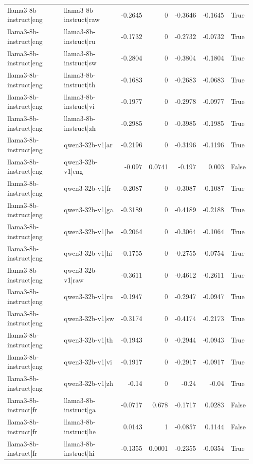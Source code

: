 \begin{table}
\begin{tabular}{l l r r r r l}
llama3-8b-instruct|eng & llama3-8b-instruct|raw & -0.2645 & 0 & -0.3646 & -0.1645 & True \\
llama3-8b-instruct|eng & llama3-8b-instruct|ru & -0.1732 & 0 & -0.2732 & -0.0732 & True \\
llama3-8b-instruct|eng & llama3-8b-instruct|sw & -0.2804 & 0 & -0.3804 & -0.1804 & True \\
llama3-8b-instruct|eng & llama3-8b-instruct|th & -0.1683 & 0 & -0.2683 & -0.0683 & True \\
llama3-8b-instruct|eng & llama3-8b-instruct|vi & -0.1977 & 0 & -0.2978 & -0.0977 & True \\
llama3-8b-instruct|eng & llama3-8b-instruct|zh & -0.2985 & 0 & -0.3985 & -0.1985 & True \\
llama3-8b-instruct|eng & qwen3-32b-v1|ar & -0.2196 & 0 & -0.3196 & -0.1196 & True \\
llama3-8b-instruct|eng & qwen3-32b-v1|eng & -0.097 & 0.0741 & -0.197 & 0.003 & False \\
llama3-8b-instruct|eng & qwen3-32b-v1|fr & -0.2087 & 0 & -0.3087 & -0.1087 & True \\
llama3-8b-instruct|eng & qwen3-32b-v1|ga & -0.3189 & 0 & -0.4189 & -0.2188 & True \\
llama3-8b-instruct|eng & qwen3-32b-v1|he & -0.2064 & 0 & -0.3064 & -0.1064 & True \\
llama3-8b-instruct|eng & qwen3-32b-v1|hi & -0.1755 & 0 & -0.2755 & -0.0754 & True \\
llama3-8b-instruct|eng & qwen3-32b-v1|raw & -0.3611 & 0 & -0.4612 & -0.2611 & True \\
llama3-8b-instruct|eng & qwen3-32b-v1|ru & -0.1947 & 0 & -0.2947 & -0.0947 & True \\
llama3-8b-instruct|eng & qwen3-32b-v1|sw & -0.3174 & 0 & -0.4174 & -0.2173 & True \\
llama3-8b-instruct|eng & qwen3-32b-v1|th & -0.1943 & 0 & -0.2944 & -0.0943 & True \\
llama3-8b-instruct|eng & qwen3-32b-v1|vi & -0.1917 & 0 & -0.2917 & -0.0917 & True \\
llama3-8b-instruct|eng & qwen3-32b-v1|zh & -0.14 & 0 & -0.24 & -0.04 & True \\
llama3-8b-instruct|fr & llama3-8b-instruct|ga & -0.0717 & 0.678 & -0.1717 & 0.0283 & False \\
llama3-8b-instruct|fr & llama3-8b-instruct|he & 0.0143 & 1 & -0.0857 & 0.1144 & False \\
llama3-8b-instruct|fr & llama3-8b-instruct|hi & -0.1355 & 0.0001 & -0.2355 & -0.0354 & True \\

\end{tabular}
\end{table}
